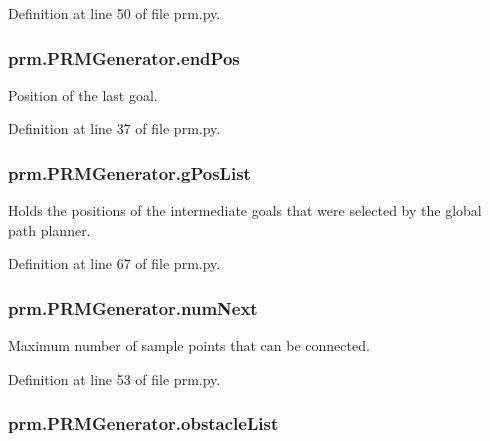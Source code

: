 Definition at line 50 of file prm.\-py.

\hypertarget{classprm_1_1PRMGenerator_a8925b6d51130804d23bb82d3b8602d74}{
\subsubsection[{end\-Pos}]{\setlength{\rightskip}{0pt plus 5cm}prm.\-P\-R\-M\-Generator.\-end\-Pos}}\label{classprm_1_1PRMGenerator_a8925b6d51130804d23bb82d3b8602d74}


Position of the last goal. 



Definition at line 37 of file prm.\-py.

\hypertarget{classprm_1_1PRMGenerator_a164c6ae962a75ed31d58eff1db95f141}{
\subsubsection[{g\-Pos\-List}]{\setlength{\rightskip}{0pt plus 5cm}prm.\-P\-R\-M\-Generator.\-g\-Pos\-List}}\label{classprm_1_1PRMGenerator_a164c6ae962a75ed31d58eff1db95f141}


Holds the positions of the intermediate goals that were selected by the global path planner. 



Definition at line 67 of file prm.\-py.

\hypertarget{classprm_1_1PRMGenerator_a84795d8a1191caae0612ac645d8853b9}{
\subsubsection[{num\-Next}]{\setlength{\rightskip}{0pt plus 5cm}prm.\-P\-R\-M\-Generator.\-num\-Next}}\label{classprm_1_1PRMGenerator_a84795d8a1191caae0612ac645d8853b9}


Maximum number of sample points that can be connected. 



Definition at line 53 of file prm.\-py.

\hypertarget{classprm_1_1PRMGenerator_a86b5b9254eb1e5f2c79fc32775c003e2}{
\subsubsection[{obstacle\-List}]{\setlength{\rightskip}{0pt plus 5cm}prm.\-P\-R\-M\-Generator.\-obstacle\-List}}\label{classprm_1_1PRMGenerator_a86b5b9254eb1e5f2c79fc32775c003e2}


